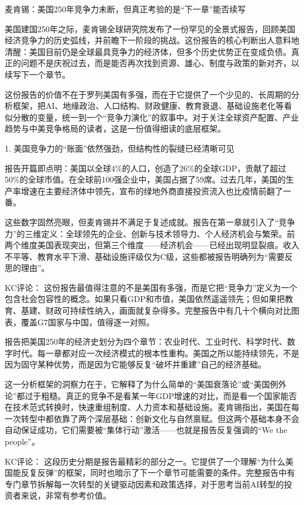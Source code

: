 \documentclass[11pt]{ctexart}
\begin{document}
麦肯锡：美国250年竞争力未断，但真正考验的是“下一章”能否续写

美国建国250年之际，麦肯锡全球研究院发布了一份罕见的全景式报告，回顾美国经济竞争力的历史弧线，并前瞻下一阶段的挑战。这份报告的核心判断出人意料地清醒：美国目前仍是全球最具竞争力的经济体，但多个历史优势正在变成负债。真正的问题不是庆祝过去，而是能否再次找到资源、雄心、制度与政策的新对齐，以续写下一个章节。

这份报告的价值不在于罗列美国有多强，而在于它提供了一个少见的、长周期的分析框架，把AI、地缘政治、人口结构、财政健康、教育衰退、基础设施老化等看似分散的变量，统一到一个“竞争力演化”的叙事中。对于关注全球资产配置、产业趋势与中美竞争格局的读者，这是一份值得细读的底层框架。

1. 美国竞争力的“账面”依然强劲，但结构性的裂缝已经清晰可见

报告开篇即点明：美国以全球4\%的人口，创造了26\%的全球GDP，贡献了超过50\%的全球市值。在全球前100强企业中，美国占据了59席。过去几年，美国的生产率增速在主要经济体中领先，宣布的绿地外商直接投资流入也比疫情前翻了一番。

这些数字固然亮眼，但麦肯锡并不满足于复述成就。报告在第一章就引入了“竞争力”的三维定义：全球领先的企业、创新与技术领导力、个人经济机会与繁荣。前两个维度美国表现突出，但第三个维度——经济机会——已经出现明显裂痕。收入不平等、教育水平下滑、基础设施评级仅为C级，这些都被报告明确列为“需要反思的理由”。

KC评论： 这份报告最值得注意的不是美国有多强，而是它把“竞争力”定义为一个包含社会包容性的概念。如果只看GDP和市值，美国依然遥遥领先；但如果把教育、基建、财政可持续性纳入，画面就复杂得多。完整报告中有几十个横向对比图表，覆盖G7国家与中国，值得逐一对照。

报告把美国250年的经济史划分为四个章节：农业时代、工业时代、科学时代、数字时代。每一章都对应一次经济模式的根本性重构。美国之所以能持续领先，不是因为固守某种优势，而是因为它能够反复“破坏并重建”自己的经济基础。

这一分析框架的洞察力在于，它解释了为什么简单的“美国衰落论”或“美国例外论”都过于粗糙。真正的竞争不是看某一年GDP增速的对比，而是看一个国家能否在技术范式转换时，快速重组制度、人力资本和基础设施。麦肯锡指出，美国在每一次转型中都依靠了两个深层基础：创新文化与自然禀赋。但这两个基础本身不会自动保证成功，它们需要被“集体行动”激活——也就是报告反复强调的“We the people”。

KC评论： 这段历史分期是报告最精彩的部分之一。它提供了一个理解“为什么美国能反复反弹”的框架，同时也暗示了下一个章节可能需要的条件。完整报告中有专门章节拆解每一次转型的关键驱动因素和政策选择，对于思考当前AI转型的投资者来说，非常有参考价值。
\end{document}
